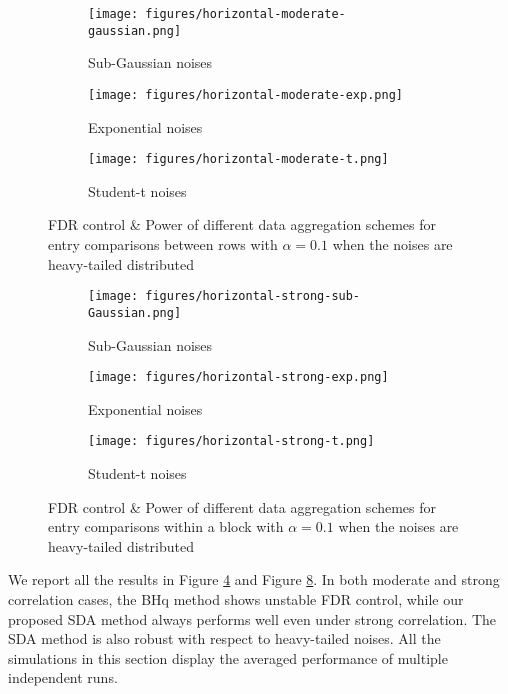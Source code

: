 \documentclass[12pt]{article}
\theoremstyle{plain}
\begin{document}
\begin{sloppypar}
\begin{figure}
\centering
\begin{subfigure}{0.8\textwidth}
     \texttt{[image: figures/horizontal-moderate-gaussian.png]}
     \caption{Sub-Gaussian noises}
     \label{fig:fdr-moderate-1}
 \end{subfigure}
 \begin{subfigure}{0.8\textwidth}
     \texttt{[image: figures/horizontal-moderate-exp.png]}
     \caption{Exponential noises }
     \label{fig:fdr-moderate-2}
 \end{subfigure}
  \begin{subfigure}{0.8\textwidth}
     \texttt{[image: figures/horizontal-moderate-t.png]}
     \caption{Student-t noises }
     \label{fig:fdr-moderate-3}
 \end{subfigure}
 \caption{FDR control \& Power of different data aggregation schemes for entry comparisons between rows with $\alpha=0.1$ when the noises are heavy-tailed distributed}
 \label{fig:fdr-moderate}
\end{figure}
\begin{figure}
\centering
\begin{subfigure}{0.8\textwidth}
     \texttt{[image: figures/horizontal-strong-sub-Gaussian.png]}
     \caption{Sub-Gaussian noises}
     \label{fig:fdr-strong-1}
 \end{subfigure}
 \begin{subfigure}{0.8\textwidth}
     \texttt{[image: figures/horizontal-strong-exp.png]}
     \caption{Exponential noises }
     \label{fig:fdr-strong-2}
 \end{subfigure}
  \begin{subfigure}{0.8\textwidth}
     \texttt{[image: figures/horizontal-strong-t.png]}
     \caption{Student-t noises }
     \label{fig:fdr-strong-3}
 \end{subfigure}
 \caption{FDR control \& Power of different data aggregation schemes for entry comparisons within a block with $\alpha=0.1$ when the noises are heavy-tailed distributed}
 \label{fig:fdr-strong}
\end{figure}
We report all the results in Figure \ref{fig:fdr-moderate} and Figure \ref{fig:fdr-strong}. In both moderate and strong correlation cases, the BHq method shows unstable FDR control, while our proposed SDA method always performs well even under strong correlation. The SDA method is also robust with respect to heavy-tailed noises.
All the simulations in this section display the averaged performance of multiple independent runs. 



\end{sloppypar}
\end{document}
